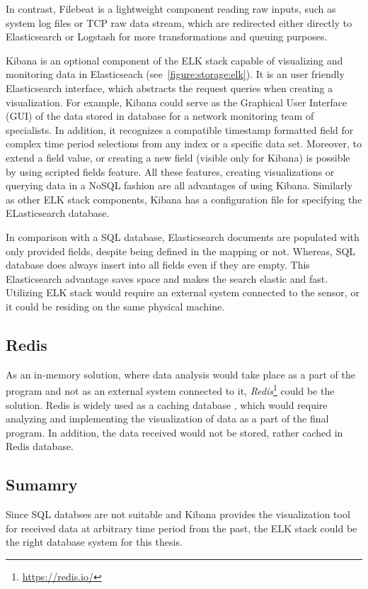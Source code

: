 \documentclass[12pt,a4paper,twoside]{report}
\begin{document}
			In contrast, Filebeat is a lightweight component reading raw inputs, such as system log files or TCP raw data stream, which are redirected either directly to Elasticsearch or Logstash for more transformations and queuing purposes.\par
			Kibana is an optional component of the ELK stack capable of visualizing and monitoring data in Elasticseach (see~\autoref{figure:storage:elk}). It is an user friendly Elasticsearch interface, which abstracts the request queries when creating a visualization. For example, Kibana could serve as the Graphical User Interface (GUI) of the data stored in database for a network monitoring team of specialists. In addition, it recognizes a compatible timestamp formatted field for complex time period selections from any index or a specific data set. Moreover, to extend a field value, or creating a new field (visible only for Kibana) is possible by using scripted fields feature. All these features, creating visualizations or querying data in a NoSQL fashion are all advantages of using Kibana. Similarly as other ELK stack components, Kibana has a configuration file for specifying the ELasticsearch database.\par
			In comparison with a SQL database, Elasticsearch documents are populated with only provided fields, despite being defined in the mapping or not. Whereas, SQL database does always insert into all fields even if they are empty. This Elasticsearch advantage saves space and makes the search elastic and fast. Utilizing ELK stack would require an external system connected to the sensor, or it could be residing on the same physical machine.\par
		\subsection{Redis} \label{analysis:storage:redis}
			As an in-memory solution, where data analysis would take place as a part of the program and not as an external system connected to it, \emph{Redis}\footnote{\url{https://redis.io/}} could be the solution. Redis is widely used as a caching database \cite{docs:redis}, which would require analyzing and implementing the visualization of data as a part of the final program. In addition, the data received would not be stored, rather cached in Redis database.
		\subsection{Sumamry} \label{analysis:storage:conclusion}
			Since SQL databses are not suitable and Kibana provides the visualization tool for received data at arbitrary time period from the past, the ELK stack could be the right database system for this thesis.
\end{document}
